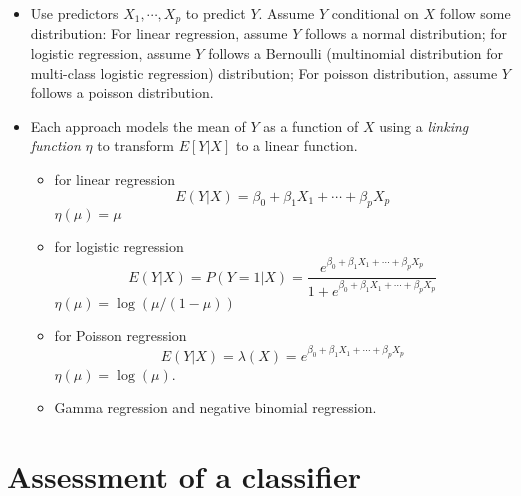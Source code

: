 \documentclass[
  letterpaper,
  DIV=11,
  numbers=noendperiod]{scrreprt}
\begin{document}
\begin{itemize}
\item
  Use predictors \(X_1, \cdots, X_p\) to predict \(Y\). Assume \(Y\)
  conditional on \(X\) follow some distribution: For linear regression,
  assume \(Y\) follows a normal distribution; for logistic regression,
  assume \(Y\) follows a Bernoulli (multinomial distribution for
  multi-class logistic regression) distribution; For poisson
  distribution, assume \(Y\) follows a poisson distribution.
\item
  Each approach models the mean of \(Y\) as a function of \(X\) using a
  \emph{linking function} \(\eta\) to transform \(E[Y|X]\) to a linear
  function.

  \begin{itemize}
  \item
    for linear regression \[
    E(Y|X)= \beta_0+\beta_1 X_1+\cdots +\beta_p X_p
    \] \(\eta(\mu) =\mu\)
  \item
    for logistic regression \[
    E(Y|X)=P(Y=1|X)=\frac{e^{\beta_0+\beta_1X_1+\cdots+\beta_pX_p}}{1+e^{\beta_0+\beta_1X_1+\cdots+\beta_pX_p}}
    \] \(\eta(\mu) = \log (\mu/(1-\mu))\)
  \item
    for Poisson regression \[
    E(Y|X) = \lambda(X) = e^{\beta_0+\beta_1X_1+\cdots+\beta_pX_p}
    \] \(\eta(\mu) = \log(\mu)\).
  \item
    Gamma regression and negative binomial regression.
  \end{itemize}
\end{itemize}

\section{Assessment of a classifier}\label{assessment-of-a-classifier}
\end{document}
